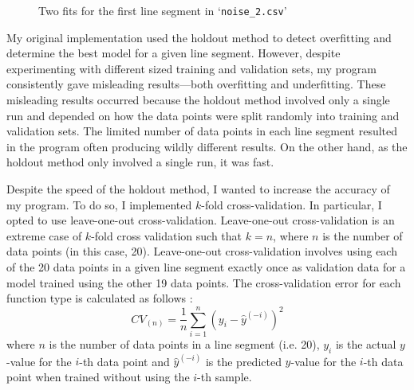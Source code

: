 \documentclass[onecolumn, 12pt, a4paper]{article}
\begin{document}
\begin{figure}[htbp]
    \centering
    \hfill
    \caption{Two fits for the first line segment in `\texttt{noise\_2.csv}'}
    \label{fig:noise_2.csv}
\end{figure}

My original implementation used the holdout method
to detect overfitting and determine the best model for a given line segment.
However, despite experimenting with different
sized training and validation sets, my program consistently gave
misleading results---both overfitting and underfitting.
These misleading results occurred because the holdout method involved only a single run 
and depended on how the data points were split randomly into training and validation sets.
The limited number of data points in each line segment resulted 
in the program often producing wildly different results.
On the other hand, as the holdout method only involved a single run, it was fast.

Despite the speed of the holdout method, I wanted to increase the accuracy
of my program.
To do so, I implemented $k$-fold cross-validation.
In particular, I opted to use leave-one-out cross-validation.
Leave-one-out cross-validation is 
an extreme case of $k$-fold cross validation
such that $k = n$, where
$n$ is the number of data points (in this case, 20).
Leave-one-out cross-validation involves using each of
the 20 data points in a given line segment exactly once as validation data for a model
trained using the other 19 data points. 
The cross-validation error for each function type is calculated
as follows \cite{Stanford}:
\[
    CV_{(n)} = \frac{1}{n} \sum_{i = 1}^{n} (y_{i} - \hat{y}^{(-i)})^{2}
\]
where
$n$ is the number of data points in a line segment (i.e. 20),
$y_{i}$ is the actual $y$-value for the $i$-th data point
and $\hat{y}^{(-i)}$ is the predicted $y$-value for the $i$-th
data point when trained without using the $i$-th sample.
\end{document}
